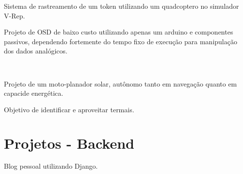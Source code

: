 \documentclass[A4]{deedy-resume} %
\begin{document}
\begin{minipage}[t]{0.66\textwidth}
\sectionspace %

\begin{tightitemize}
 \item Sistema de rastreamento de um token utilizando um quadcoptero no simulador V-Rep.
 \end{tightitemize}
 
\sectionspace %

\begin{tightitemize}
 \item Projeto de OSD de baixo custo utilizando apenas um arduino e componentes passivos, dependendo fortemente do tempo fixo de execução para manipulação dos dados analógicos.
 \end{tightitemize}
 
\sectionspace %

\\
\begin{tightitemize}
 \item Projeto de um moto-planador solar, autônomo tanto em navegação quanto em capacide energética.
 \item Objetivo de identificar e aproveitar termais.
 \end{tightitemize}
 
\sectionspace %

\section{Projetos - Backend}

\begin{tightitemize}
 \item Blog pessoal utilizando Django.
\end{tightitemize}

\sectionspace %


\end{minipage}
\end{document}
